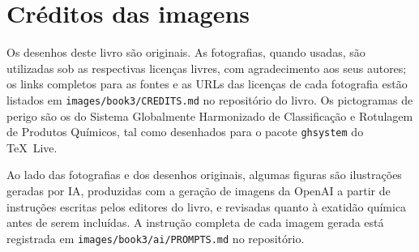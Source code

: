 \chapter*{Créditos das imagens}

Os desenhos deste livro são originais. As fotografias, quando usadas, são
utilizadas sob as respectivas licenças livres, com agradecimento aos seus
autores; os links completos para as fontes e as URLs das licenças de cada
fotografia estão listados em \texttt{images/book3/CREDITS.md} no
repositório do livro.
Os pictogramas de perigo são os do Sistema Globalmente Harmonizado de
Classificação e Rotulagem de Produtos Químicos, tal como desenhados para o
pacote \texttt{ghsystem} do \TeX\ Live.

\bigskip
Ao lado das fotografias e dos desenhos originais, algumas figuras são
ilustrações geradas por IA, produzidas com a geração de imagens da OpenAI a
partir de instruções escritas pelos editores do livro, e revisadas quanto à
exatidão química antes de serem incluídas. A instrução completa de cada
imagem gerada está registrada em \texttt{images/book3/ai/PROMPTS.md} no
repositório.

